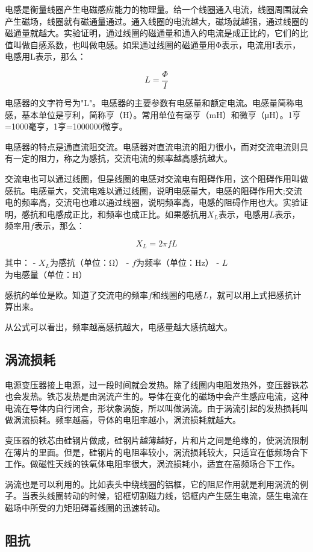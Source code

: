 \documentclass[12pt,UTF8]{ctexbook}
\begin{document}
电感是衡量线圈产生电磁感应能力的物理量。给一个线圈通入电流，线圈周围就会产生磁场，线圈就有磁通量通过。通入线圈的电流越大，磁场就越强，通过线圈的磁通量就越大。实验证明，通过线圈的磁通量和通入的电流是成正比的，它们的比值叫做自感系数，也叫做电感。如果通过线圈的磁通量用Φ表示，电流用I表示，电感用L表示，那么：

\[ L = \frac{\Phi}{I} \]

电感器的文字符号为"L"。电感器的主要参数有电感量和额定电流。电感量简称电感，基本单位是亨利，简称亨（H）。常用单位有毫亨（mH）和微亨（μH）。1亨=1000毫亨，1亨=1000000微亨。

电感器的特点是通直流阻交流。电感器对直流电流的阻力很小，而对交流电流则具有一定的阻力，称之为感抗，交流电流的频率越高感抗越大。

交流电也可以通过线圈，但是线圈的电感对交流电有阻碍作用，这个阻碍作用叫做感抗。电感量大，交流电难以通过线圈，说明电感量大，电感的阻碍作用大;交流电的频率高，交流电也难以通过线圈，说明频率高，电感的阻碍作用也大。实验证明，感抗和电感成正比，和频率也成正比。如果感抗用$X_L$表示，电感用$L$表示，频率用$f$表示，那么：

\[ X_L = 2\pi f L \]

其中：
- $X_L$为感抗（单位：Ω）
- $f$为频率（单位：Hz）
- $L$为电感量（单位：H）

感抗的单位是欧。知道了交流电的频率$f$和线圈的电感$L$，就可以用上式把感抗计算出来。

从公式可以看出，频率越高感抗越大，电感量越大感抗越大。

\subsection{涡流损耗}

电源变压器接上电源，过一段时间就会发热。除了线圈内电阻发热外，变压器铁芯也会发热。铁芯发热是由涡流产生的。导体在变化的磁场中会产生感应电流，这种电流在导体内自行闭合，形状象涡旋，所以叫做涡流。由于涡流引起的发热损耗叫做涡流损耗。频率越高，导体的电阻率越小，涡流损耗就越大。

变压器的铁芯由硅钢片做成，硅钢片越薄越好，片和片之间是绝缘的，使涡流限制在薄片的里面。但是，硅钢片的电阻率较小，涡流损耗较大，只适宜在低频场合下工作。做磁性天线的铁氧体电阻率很大，涡流损耗小，适宜在高频场合下工作。

涡流也是可以利用的。比如表头中绕线圈的铝框，它的阻尼作用就是利用涡流的例子。当表头线圈转动的时候，铝框切割磁力线，铝框内产生感生电流，感生电流在磁场中所受的力矩阻碍着线圈的迅速转动。

\subsection{阻抗}
\end{document}

